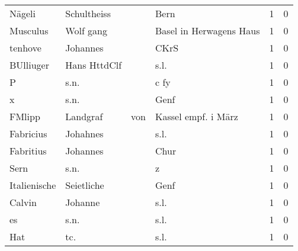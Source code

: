 \begin{center}
\begin{tiny}
\begin{longtabu}{llllrr}
                   Nägeli &                        Schultheiss &             &                                        Bern &          1 &         0 \\
                 Musculus &                          Wolf gang &             &                     Basel in Herwagens Haus &          1 &         0 \\
                  tenhove &                           Johannes &             &                                        CKrS &          1 &         0 \\
                BUlliuger &                       Hans HttdClf &             &                                        s.l. &          1 &         0 \\
                        P &                               s.n. &             &                                        c fy &          1 &         0 \\
                        x &                               s.n. &             &                                        Genf &          1 &         0 \\
                   FMlipp &                           Landgraf &         von &                         Kassel empf. i März &          1 &         0 \\
                Fabricius &                           Johahnes &             &                                        s.l. &          1 &         0 \\
                Fabritius &                           Johannes &             &                                        Chur &          1 &         0 \\
                     Sern &                               s.n. &             &                                           z &          1 &         0 \\
             Italienische &                         Seietliche &             &                                        Genf &          1 &         0 \\
                   Calvin &                            Johanne &             &                                        s.l. &          1 &         0 \\
                       es &                               s.n. &             &                                        s.l. &          1 &         0 \\
                      Hat &                                tc. &             &                                        s.l. &          1 &         0 \\

\end{longtabu}
\end{tiny}
\end{center}
